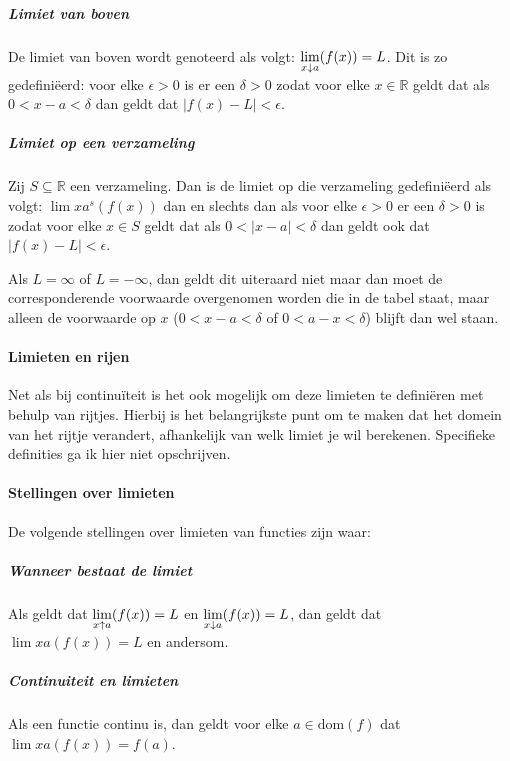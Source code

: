 \subparagraph{Limiet van boven} De limiet van boven wordt genoteerd als volgt: $\underset{x\downarrow a}{\text{lim}}(f(x))=L$. Dit is zo gedefiniëerd: voor elke $\epsilon>0$ is er een $\delta>0$ zodat voor elke $x\in\mathbb{R}$ geldt dat als $0<x-a<\delta$ dan geldt dat $|f(x)-L|<\epsilon$.

\subparagraph{Limiet op een verzameling} Zij $S\subseteq\mathbb{R}$ een verzameling. Dan is de limiet op die verzameling gedefiniëerd als volgt: $\lim{x}{a^{s}}(f(x))$ dan en slechts dan als voor elke $\epsilon>0$ er een $\delta>0$ is zodat voor elke $x\in S$ geldt dat als $0<|x-a|<\delta$ dan geldt ook dat $|f(x)-L|<\epsilon$. \bigskip

\noindent Als $L=\infty$ of $L=-\infty$, dan geldt dit uiteraard niet maar dan moet de corresponderende voorwaarde overgenomen worden die in de tabel staat, maar alleen de voorwaarde op $x$ ($0<x-a<\delta$ of $0<a-x<\delta$) blijft dan wel staan.

\paragraph{Limieten en rijen} Net als bij continuïteit is het ook mogelijk om deze limieten te definiëren met behulp van rijtjes. Hierbij is het belangrijkste punt om te maken dat het domein van het rijtje verandert, afhankelijk van welk limiet je wil berekenen. Specifieke definities ga ik hier niet opschrijven.

\paragraph{Stellingen over limieten} De volgende stellingen over limieten van functies zijn waar:

\subparagraph{Wanneer bestaat de limiet} Als geldt dat $\underset{x\uparrow a}{\text{lim}}(f(x))=L$ en $\underset{x\downarrow a}{\text{lim}}(f(x))=L$, dan geldt dat $\lim{x}{a}(f(x))=L$ en andersom.

\subparagraph{Continuiteit en limieten} Als een functie continu is, dan geldt voor elke $a\in\text{dom}(f)$ dat \\$\lim{x}{a}(f(x))=f(a)$.

